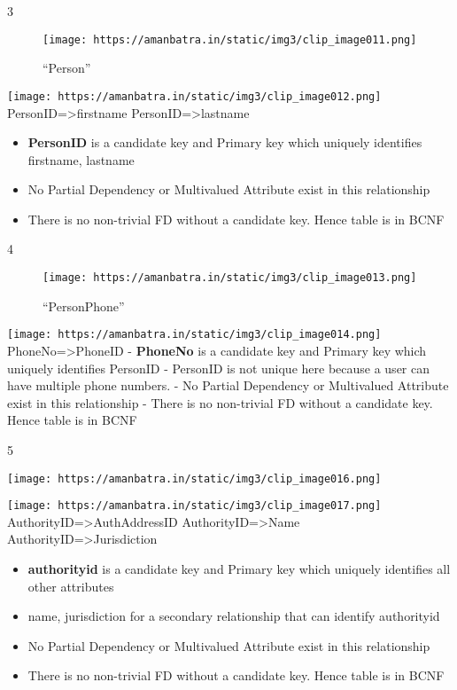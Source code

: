 \documentclass[
]{article}
\providecommand{\tightlist}{%
  \setlength{\itemsep}{0pt}\setlength{\parskip}{0pt}}
\begin{document}
3

\begin{figure}
\centering
\texttt{[image: https://amanbatra.in/static/img3/clip\_image011.png]}
\caption{``Person''}
\end{figure}

\texttt{[image: https://amanbatra.in/static/img3/clip\_image012.png]}
PersonID=\textgreater firstname PersonID=\textgreater lastname

\begin{itemize}
\tightlist
\item
  \textbf{PersonID} is a candidate key and Primary key which uniquely
  identifies firstname, lastname
\item
  No Partial Dependency or Multivalued Attribute exist in this
  relationship
\item
  There is no non-trivial FD without a candidate key. Hence table is in
  BCNF
\end{itemize}

4

\begin{figure}
\centering
\texttt{[image: https://amanbatra.in/static/img3/clip\_image013.png]}
\caption{``PersonPhone''}
\end{figure}

\texttt{[image: https://amanbatra.in/static/img3/clip\_image014.png]}
PhoneNo=\textgreater PhoneID - \textbf{PhoneNo} is a candidate key and
Primary key which uniquely identifies PersonID - PersonID is not unique
here because a user can have multiple phone numbers. - No Partial
Dependency or Multivalued Attribute exist in this relationship - There
is no non-trivial FD without a candidate key. Hence table is in BCNF

5

\texttt{[image: https://amanbatra.in/static/img3/clip\_image016.png]}

\texttt{[image: https://amanbatra.in/static/img3/clip\_image017.png]}
AuthorityID=\textgreater AuthAddressID AuthorityID=\textgreater Name
AuthorityID=\textgreater Jurisdiction

\begin{itemize}
\tightlist
\item
  \textbf{authorityid} is a candidate key and Primary key which uniquely
  identifies all other attributes
\item
  name, jurisdiction for a secondary relationship that can identify
  authorityid
\item
  No Partial Dependency or Multivalued Attribute exist in this
  relationship
\item
  There is no non-trivial FD without a candidate key. Hence table is in
  BCNF
\end{itemize}
\end{document}
